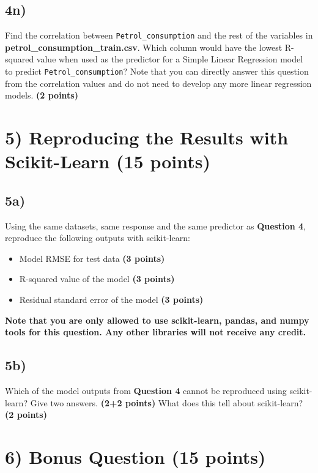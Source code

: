 \documentclass[
  letterpaper,
  DIV=11,
  numbers=noendperiod]{scrreprt}
\providecommand{\tightlist}{%
  \setlength{\itemsep}{0pt}\setlength{\parskip}{0pt}}\usepackage{longtable,booktabs,array}
\begin{document}
\subsection{4n)}\label{n}

Find the correlation between \texttt{Petrol\_consumption} and the rest
of the variables in \textbf{petrol\_consumption\_train.csv}. Which
column would have the lowest R-squared value when used as the predictor
for a Simple Linear Regression model to predict
\texttt{Petrol\_consumption}? Note that you can directly answer this
question from the correlation values and do not need to develop any more
linear regression models. \textbf{(2 points)}

\section{5) Reproducing the Results with Scikit-Learn (15
points)}\label{reproducing-the-results-with-scikit-learn-15-points}

\subsection{5a)}\label{a-3}

Using the same datasets, same response and the same predictor as
\textbf{Question 4}, reproduce the following outputs with scikit-learn:

\begin{itemize}
\tightlist
\item
  Model RMSE for test data \textbf{(3 points)}
\item
  R-squared value of the model \textbf{(3 points)}
\item
  Residual standard error of the model \textbf{(3 points)}
\end{itemize}

\textbf{Note that you are only allowed to use scikit-learn, pandas, and
numpy tools for this question. Any other libraries will not receive any
credit.}

\subsection{5b)}\label{b-3}

Which of the model outputs from \textbf{Question 4} cannot be reproduced
using scikit-learn? Give two answers. \textbf{(2+2 points)} What does
this tell about scikit-learn? \textbf{(2 points)}

\section{6) Bonus Question (15 points)}\label{bonus-question-15-points}
\end{document}
